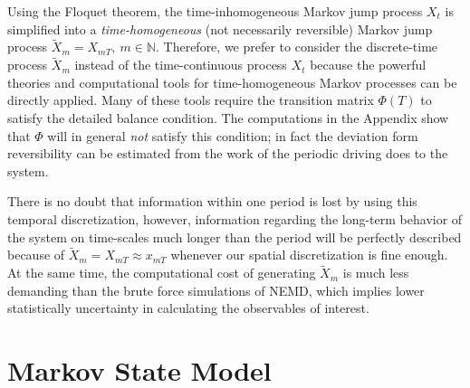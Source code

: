 \documentclass[aps, pre, preprint,unsortedaddress,a4paper,onecolumn]{revtex4}
\newcommand{\myphi}{\Phi}
\begin{document}
Using the Floquet theorem, the time-inhomogeneous Markov jump process $X_t$
is simplified into a \emph{time-homogeneous} (not necessarily
reversible) Markov jump process $\tilde X_{m} = X_{mT}, \ m\in\mathbb
N$.
Therefore, we prefer to consider the discrete-time process $\tilde X_{m}$ instead of the time-continuous process $X_t$
because the powerful theories and
computational tools for time-homogeneous Markov processes can be directly applied. Many of these tools require the transition matrix $\myphi(T)$ to satisfy the detailed balance condition. The computations in the Appendix show that $\myphi$ will in general \emph{not} satisfy this condition; in fact  the deviation form reversibility can be estimated from the work of the periodic driving does to the system.


There is no doubt that information within one period is lost by using this temporal
discretization, however, information regarding the long-term behavior of the system on time-scales
much longer than the period will be perfectly described because of $\tilde X_{m} = X_{mT}\approx x_{mT}$ whenever our spatial discretization is fine enough.
At the same time,
the computational cost of generating $\tilde X_{m}$ is much less demanding
than the brute force simulations of NEMD, which implies lower
statistically uncertainty in calculating the observables of interest.


\section{Markov State Model}
\label{sec:build-msm}
\end{document}
